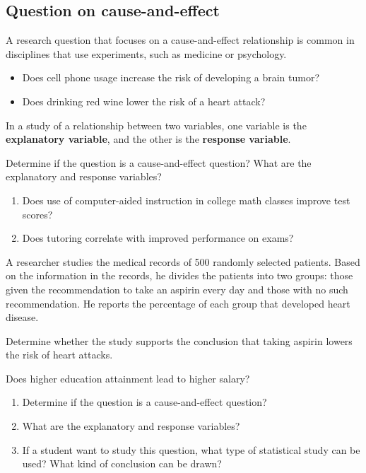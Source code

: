 \hypertarget{question-on-cause-and-effect}{%
\subsection{Question on
cause-and-effect}\label{question-on-cause-and-effect}}

A research question that focuses on a cause-and-effect relationship is common in disciplines that use experiments, such as medicine or psychology.

  \begin{itemize}
  \item
    Does cell phone usage increase the risk of developing a brain tumor?
  \item
    Does drinking red wine lower the risk of a heart attack?
  \end{itemize}

In a study of a relationship between two variables, one variable is
the \textbf{explanatory variable}, and the other is the
\textbf{response variable}.

\begin{example}
  Determine if the question is a cause-and-effect question? What are the
  explanatory and response variables?
  
  \begin{enumerate}[parsep=3\baselineskip]
  \item
    Does use of computer-aided instruction in college math classes improve
    test scores?
  \item
    Does tutoring correlate with improved performance on exams?
  \end{enumerate}
\end{example}
\vspace*{-2\baselineskip}

\begin{exercise}
  A researcher studies the medical records of 500 randomly selected
  patients. Based on the information in the records, he divides the
  patients into two groups: those given the recommendation to take an
  aspirin every day and those with no such recommendation. He reports
  the percentage of each group that developed heart disease.

  Determine whether the study supports the conclusion that taking
  aspirin lowers the risk of heart attacks.
\end{exercise}
\vspace*{3\baselineskip}

\begin{exercise}
  Does higher education attainment lead to higher salary?
\begin{enumerate}[itemsep=2\baselineskip]
\item
  Determine if the question is a cause-and-effect question?
\item
  What are the explanatory and response variables?
\item
  If a student want to study this question, what type of statistical
  study can be used? What kind of conclusion can be drawn?
\end{enumerate}
\end{exercise}



